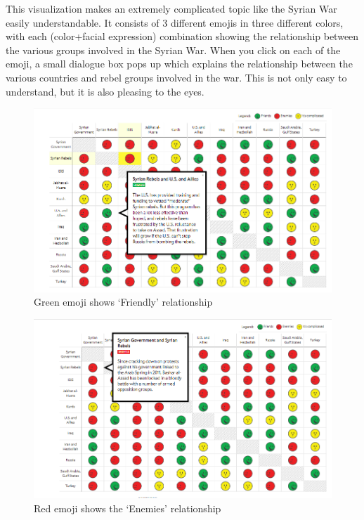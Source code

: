 \documentclass[]{book}
\theoremstyle{definition}
\theoremstyle{definition}
\theoremstyle{definition}
\theoremstyle{remark}
\begin{document}
This visualization makes an extremely complicated topic like the Syrian
War easily understandable. It consists of 3 different emojis in three
different colors, with each (color+facial expression) combination
showing the relationship between the various groups involved in the
Syrian War. When you click on each of the emoji, a small dialogue box
pops up which explains the relationship between the various countries
and rebel groups involved in the war. This is not only easy to
understand, but it is also pleasing to the eyes.

\begin{figure}
\centering
\includegraphics{images/img_syria_friendly.PNG}
\caption{Green emoji shows `Friendly' relationship}
\end{figure}

\begin{figure}
\centering
\includegraphics{images/img_syria_enemies.PNG}
\caption{Red emoji shows the `Enemies' relationship}
\end{figure}
\end{document}
